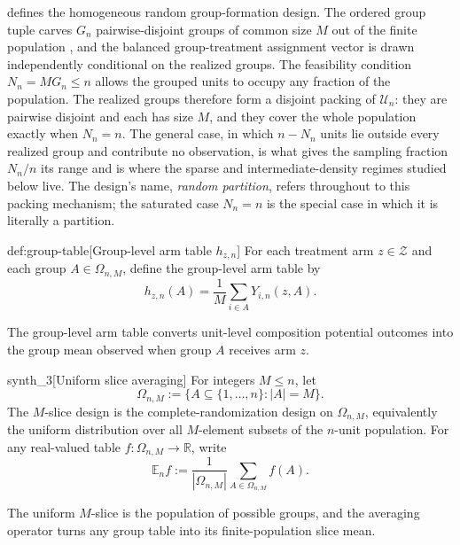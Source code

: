  defines the homogeneous random group-formation design. The ordered group tuple  carves \(G_n\) pairwise-disjoint groups of common size \(M\) out of the finite population , and the balanced group-treatment assignment vector  is drawn independently conditional on the realized groups. The feasibility condition \(N_n=MG_n\le n\) allows the grouped units to occupy any fraction of the population. The realized groups therefore form a disjoint packing of \(\mathcal U_n\): they are pairwise disjoint and each has size \(M\), and they cover the whole population exactly when \(N_n=n\). The general case, in which \(n-N_n\) units lie outside every realized group and contribute no observation, is what gives the sampling fraction \(N_n/n\) its range and is where the sparse and intermediate-density regimes studied below live. The design's name, \emph{random partition}, refers throughout to this packing mechanism; the saturated case \(N_n=n\) is the special case in which it is literally a partition.

\begin{definitionv}{def:group-table}[Group-level arm table \(h_{z,n}\)]
For each treatment arm \(z\in\mathcal Z\) and each group \(A\in\Omega_{n,M}\), define the group-level arm table by
\[
h_{z,n}(A)=\frac{1}{M}\sum_{i\in A}Y_{i,n}(z,A).
\]
\end{definitionv}

The group-level arm table  converts unit-level composition potential outcomes into the group mean observed when group \(A\) receives arm \(z\).

\begin{definitionv}{synth_3}[Uniform slice averaging]
For integers \(M\le n\), let
\[
\Omega_{n,M}:=\{A\subseteq\{1,\ldots,n\}: |A|=M\}.
\]
The \(M\)-slice design is the complete-randomization design on \(\Omega_{n,M}\), equivalently the uniform distribution over all \(M\)-element subsets of the \(n\)-unit population. For any real-valued table \(f:\Omega_{n,M}\to\mathbb R\), write
\[
\mathbb E_n f
:=
\frac{1}{|\Omega_{n,M}|}\sum_{A\in\Omega_{n,M}} f(A).
\]
\end{definitionv}

The uniform \(M\)-slice  is the population of possible groups, and the averaging operator  turns any group table into its finite-population slice mean.

